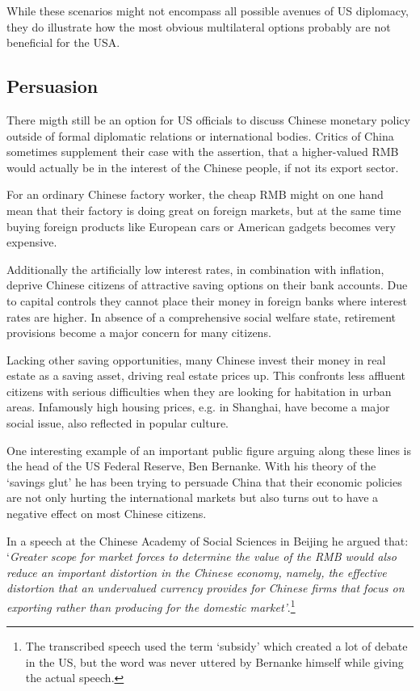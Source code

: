 While these scenarios might not encompass all possible avenues of US diplomacy, they do illustrate how the most obvious 
multilateral options probably are not beneficial for the USA.


\subsection{Persuasion}

There migth still be an option for US officials to discuss Chinese monetary policy outside of formal diplomatic relations or international bodies. Critics of China sometimes supplement their case with the assertion, 
that a higher-valued RMB would actually be in the interest of the 
Chinese people, if not its export sector.

For an ordinary Chinese factory worker, the cheap RMB might on one hand 
mean that their factory is doing great on foreign markets, but at the 
same time buying foreign products like European cars or American gadgets 
becomes very expensive. 

Additionally the artificially low interest rates, in combination with 
inflation, deprive Chinese citizens of attractive saving options on 
their bank accounts. Due to capital controls they cannot place their 
money in foreign banks where interest rates are higher. In absence of a 
comprehensive social welfare state, retirement provisions become a major 
concern for many citizens.

Lacking other saving opportunities, many Chinese invest their money in 
real estate as a saving asset, driving real estate prices up.  This 
confronts less affluent citizens with serious difficulties when they are 
looking for habitation in urban areas.  Infamously high housing prices, 
e.g.  in Shanghai, have become a major social issue, also reflected in 
popular culture. 

One interesting example of an important public figure arguing along 
these lines is the head of the US Federal Reserve, Ben Bernanke. With his theory of the `savings glut' he has 
been trying to persuade China that their economic policies are not only 
hurting the international markets but also turns out to have a negative 
effect on most Chinese citizens.  

In a speech at the Chinese Academy of Social Sciences in Beijing he 
argued that: `\textit{Greater scope for market forces to determine the 
	value of the RMB would also reduce an important distortion in the 
	Chinese economy, namely, the effective distortion that an 
undervalued currency provides for Chinese firms that focus on exporting 
rather than producing for the domestic market'}.\footnote{The 
	transcribed speech \cite{Bernanke06} used the term `subsidy' which 
created a lot of debate in the US, but the word was never uttered by 
Bernanke himself while giving the actual speech\cite{reuters06}.}

